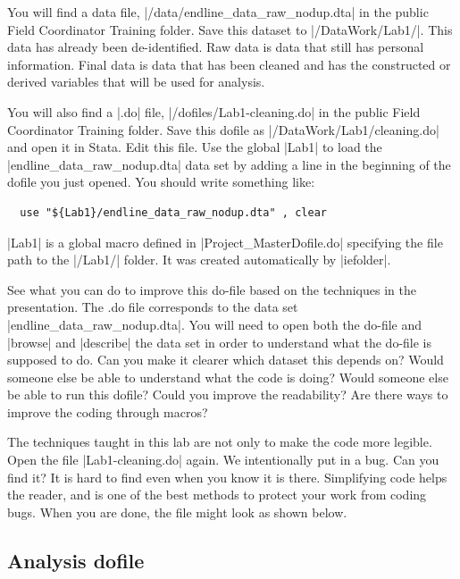 \documentclass{tufte-handout}
\begin{document}
You will find a data file, |/data/endline_data_raw_nodup.dta|
in the public Field Coordinator Training folder.
Save this dataset to |/DataWork/Lab1/|.
This data has already been de-identified.
Raw data is data that still has personal information.
Final data is data that has been cleaned
and has the constructed or derived variables that will be used for analysis.

You will also find a |.do| file, |/dofiles/Lab1-cleaning.do|
in the public Field Coordinator Training folder.
Save this dofile as |/DataWork/Lab1/cleaning.do| and open it in Stata.
Edit this file.
Use the global |Lab1| to load the |endline_data_raw_nodup.dta| data set
by adding a line in the beginning of the dofile you just opened.
You should write something like:
\begin{Verbatim}
  use "${Lab1}/endline_data_raw_nodup.dta" , clear
\end{Verbatim}
|Lab1| is a global macro defined in |Project_MasterDofile.do|
specifying the file path to the |/Lab1/| folder.
It was created automatically by |iefolder|.

See what you can do to improve this do-file
based on the techniques in the presentation.
The .do file corresponds to the data set |endline_data_raw_nodup.dta|.
You will need to open both the do-file and |browse| and |describe|
the data set in order to understand what the do-file is supposed to do.
Can you make it clearer which dataset this depends on?
Would someone else be able to understand what the code is doing?
Would someone else be able to run this dofile?
Could you improve the readability?
Are there ways to improve the coding through macros?

The techniques taught in this lab are not only to make the code more legible.
Open the file |Lab1-cleaning.do| again.
We intentionally put in a bug. Can you find it?
It is hard to find even when you know it is there.
Simplifying code helps the reader,
and is one of the best methods to protect your work from coding bugs.
When you are done, the file might look as shown below.

\begin{figure}[h]
{
}
\end{figure}

\subsection{Analysis dofile}
\end{document}

